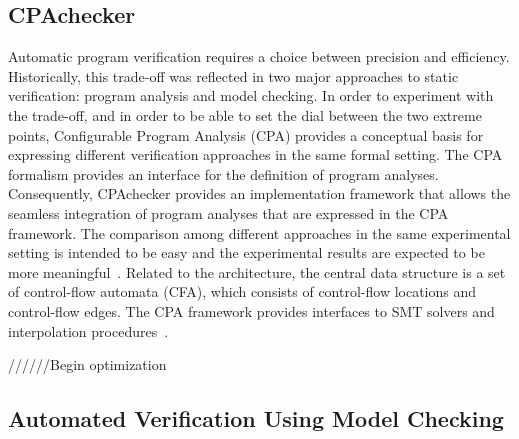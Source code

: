 \subsection{CPAchecker}
Automatic program verification requires a choice between precision and efficiency. %
Historically, this trade-off was reflected in two major approaches to static verification: program analysis and model checking. In order to experiment with the trade-off, and in order to be able to set the dial between the two extreme points, Configurable Program Analysis (CPA) provides a conceptual basis for expressing different verification approaches in the same formal setting. The CPA formalism provides an interface for the definition of program analyses. Consequently, CPAchecker provides an implementation framework that allows the seamless integration of program analyses that are expressed in the CPA framework. The comparison among different approaches in the same experimental setting is intended to be easy and the experimental results are expected to be more meaningful~\cite{Beyer2011}. Related to the architecture, the central data structure is a set of control-flow automata (CFA), which consists of control-flow locations and control-flow edges. The CPA framework provides interfaces to SMT solvers and interpolation procedures~\cite{Beyer2011}. %

//////Begin optimization
\subsection{Automated Verification Using Model Checking}
\label{sec:AutomatedVerification}

